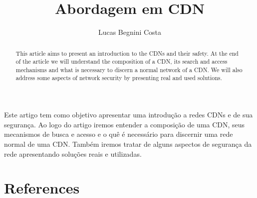 \documentclass[12pt]{article}
\title{Abordagem em CDN}
\author{Lucas Begnini Costa\inst{1}}
\begin{document}
 

\maketitle

\begin{resumo} 
Este artigo tem como objetivo apresentar uma introdu\c{c}\~ao a redes CDNs e de sua seguran\c{c}a. Ao logo do artigo iremos entender a composi\c{c}\~ao de uma CDN, seus mecanismos de busca e acesso e o qu\^e \'e necess\'ario para discernir uma rede normal de uma CDN. Tamb\'em iremos tratar de alguns aspectos de seguran\c{c}a da rede apresentando solu\c{c}\~oes reais e utilizadas.
\end{resumo}

\begin{abstract}
This article aims to present an introduction to the CDNs and their safety. At the end of the article we will understand the composition of a CDN, its search and access mechanisms and what is necessary to discern a normal network of a CDN. We will also address some aspects of network security by presenting real and used solutions.
\end{abstract}
 
\maketitle

\tableofcontents %
\listoftables %
\listoffigures %
     








\newpage
\section{References}



\end{document}
